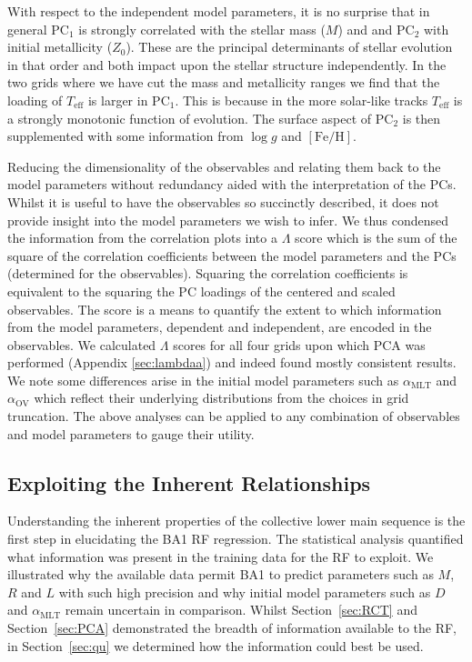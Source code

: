 With respect to the independent model parameters, it is no surprise that in general PC$_1$ is strongly correlated with the stellar mass ($M$) and  and PC$_2$ with initial metallicity ($Z_0$). 
These are the principal determinants of stellar evolution in that order and both impact upon the stellar structure independently.
In the two grids where we have cut the mass and metallicity ranges we find that the loading of $T_{\text{eff}}$ is larger in PC$_1$.
This is because in the more solar-like tracks $T_{\text{eff}}$ is a strongly monotonic function of evolution.
The surface aspect of PC$_2$ is then supplemented with some information from  ${\log{} g}$ and ${[\text{Fe/H}]}$.

Reducing the dimensionality of the observables and relating them back to the model parameters without redundancy aided with the interpretation of the PCs. 
Whilst it is useful to have the observables so succinctly described, it does not provide insight into the model parameters we wish to infer. 
We thus condensed the information from the correlation plots into a $\Lambda$ score which 
is the sum of the square of the correlation coefficients  between the model parameters and the PCs (determined for the observables). Squaring the correlation coefficients is equivalent to the squaring the PC loadings of the centered and scaled observables. 
The score is a means to quantify the extent to which information from the model parameters, dependent and independent, are encoded in the observables.
We calculated $\Lambda$ scores for all four grids upon which PCA was performed (Appendix \ref{sec:lambdaa}) and indeed found mostly consistent results. We note some differences arise in the initial model parameters such as $\alpha_{\text{MLT}}$ and $\alpha_{\text{OV}}$ which reflect their underlying 
distributions from the choices in grid truncation. The above analyses can be applied to any combination of observables and model parameters to gauge their utility.



\subsection{Exploiting the Inherent Relationships}

Understanding the inherent properties of the collective lower main sequence is the first step in elucidating the BA1 RF regression. The statistical analysis quantified what information was present in the training data for the RF to exploit. We illustrated why the available data permit BA1 to predict parameters such as $M$, $R$ and $L$ with such high precision and why initial model parameters such as $D$ and $\alpha_{\text{MLT}}$ remain uncertain in comparison. Whilst  Section~\ref{sec:RCT} and Section~\ref{sec:PCA} demonstrated the breadth of information available to the RF, in Section~\ref{sec:qu} we determined how the information could best be used. 

